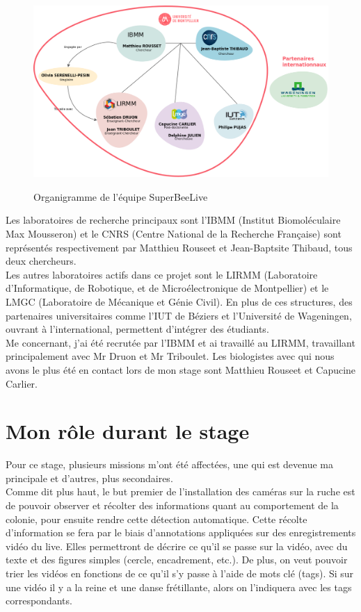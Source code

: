 \documentclass[11pt,french,a4paper]{report}
\begin{document}
\begin{figure}[!h]
\centering
\includegraphics[scale=0.3]{../images/dia/organiramme_equipe_projet.png} \\
\caption{Organigramme de l'équipe SuperBeeLive}
\label{orga_sbl}
\end{figure}

Les laboratoires de recherche principaux sont l'IBMM (Institut Biomoléculaire Max Mousseron) 
et le CNRS (Centre National de la Recherche Française) sont représentés respectivement par Matthieu Rouseet et Jean-Baptsite Thibaud, 
tous deux chercheurs. \\
Les autres laboratoires actifs dans ce projet sont le LIRMM (Laboratoire d'Informatique, de Robotique, 
et de Microélectronique de Montpellier) et le LMGC (Laboratoire de Mécanique et Génie Civil). En plus de ces structures, 
des partenaires universitaires comme l'IUT de Béziers et l'Université de Wageningen, ouvrant à l'international,
permettent d'intégrer des étudiants. \\
Me concernant, j'ai été recrutée par l'IBMM et ai travaillé au LIRMM, travaillant principalement avec Mr Druon et 
Mr Triboulet. Les biologistes avec qui nous avons le plus été en contact lors de mon stage sont Matthieu Rouseet et Capucine Carlier. \\


\section{Mon rôle durant le stage}
Pour ce stage, plusieurs missions m'ont été affectées, une qui est devenue ma principale et d'autres, plus secondaires.\\

Comme dit plus haut, le but premier de l'installation des caméras sur la ruche est de pouvoir observer et récolter des informations
quant au comportement de la colonie, pour ensuite rendre cette détection automatique. Cette récolte d'information se fera par le 
biais d'annotations appliquées sur des enregistrements vidéo du live. Elles permettront de décrire ce qu'il se passe sur la vidéo, 
avec du texte et des figures simples (cercle, encadrement, etc.).
De plus, on veut pouvoir trier les vidéos en fonctions de ce qu'il s'y passe à l'aide de mots clé (tags). 
Si sur une vidéo il y a la reine et une danse frétillante, alors on l'indiquera avec les tags correspondants. \\
\end{document}

